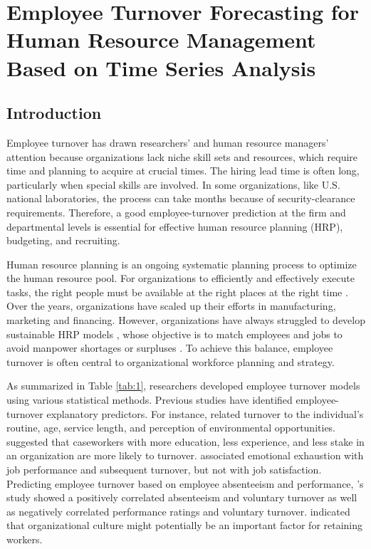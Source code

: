 \chapter{Employee Turnover Forecasting for Human Resource Management Based on Time Series Analysis}\label{ch:timesereis}
\section{Introduction}
Employee turnover has drawn researchers' and human resource managers' attention because organizations lack  niche skill sets and resources, which require time and planning to acquire at crucial times. The hiring lead time is often long, particularly when special skills are involved. In some organizations, like U.S. national laboratories, the process can take months because of security-clearance requirements. Therefore, a good employee-turnover prediction at the firm and departmental levels is essential for effective human resource planning (HRP), budgeting, and recruiting. 

Human resource planning is an ongoing systematic planning process to optimize the human resource pool. For organizations to efficiently and effectively execute tasks, the right people must be available at the right places at the right time \citep{khoong1996}. Over the years, organizations have scaled up their efforts in manufacturing, marketing and financing. However, organizations have always struggled to develop sustainable HRP models  \citep{heneman1993}, whose objective is to match employees and jobs to avoid manpower shortages or surpluses \citep{cambal2011}. To achieve this balance, employee turnover is often central to organizational workforce planning and strategy.

As summarized in Table \ref{tab:1}, researchers developed employee turnover models using various statistical methods. Previous studies have identified employee-turnover explanatory predictors. For instance, \citet{bluedorn1982} related turnover to the individual's routine, age, service length, and perception of environmental opportunities. \citet{balfour1993} suggested that caseworkers with more education, less experience, and less stake in an organization are more likely to turnover. \citet{wright1998} associated emotional exhaustion with job performance and subsequent turnover, but not with job satisfaction. Predicting employee turnover based on employee absenteeism and performance, \citet{morrow1999}'s study showed a positively correlated absenteeism and voluntary turnover as well as negatively correlated performance ratings and voluntary turnover. \citet{thaden2010} indicated that organizational culture might potentially be an important factor for retaining workers. 

